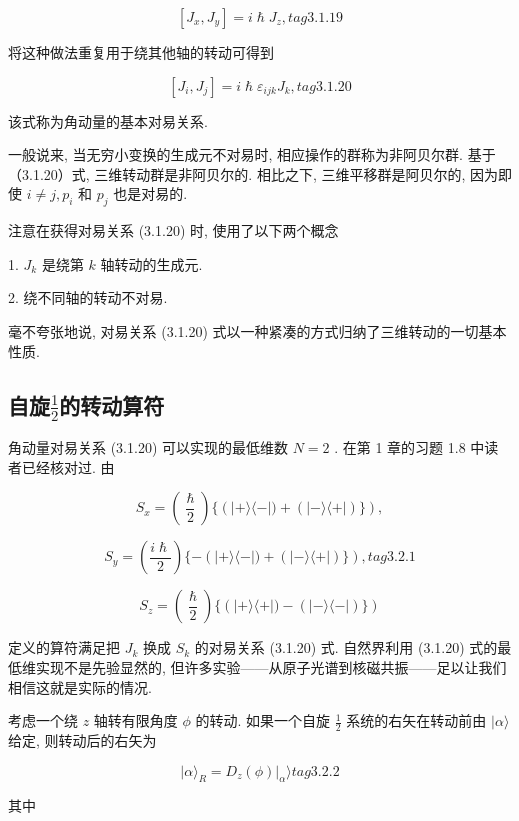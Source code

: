 $$
\left\lbrack {{J}_{x},{J}_{y}}\right\rbrack = i\hslash {J}_{z}, tag{3.1.19}
$$

将这种做法重复用于绕其他轴的转动可得到

$$
\left\lbrack {{J}_{i},{J}_{j}}\right\rbrack = i\hslash {\varepsilon }_{ijk}{J}_{k}, tag{3.1.20}
$$

该式称为角动量的基本对易关系.

一般说来, 当无穷小变换的生成元不对易时, 相应操作的群称为非阿贝尔群. 基于 （3.1.20）式, 三维转动群是非阿贝尔的. 相比之下, 三维平移群是阿贝尔的, 因为即使 $i \neq j,{p}_{i}$ 和 ${p}_{j}$ 也是对易的.

注意在获得对易关系 (3.1.20) 时, 使用了以下两个概念

1. ${J}_{k}$ 是绕第 $k$ 轴转动的生成元.

2. 绕不同轴的转动不对易.

毫不夸张地说, 对易关系 (3.1.20) 式以一种紧凑的方式归纳了三维转动的一切基本性质.

\subsection{自旋$\frac{1}{2}$的转动算符}

角动量对易关系 (3.1.20) 可以实现的最低维数 $N = 2$ . 在第 1 章的习题 1.8 中读者已经核对过. 由

$$
{S}_{x} = \left( \frac{\hslash }{2}\right) \{ \left( {\left| {+\rangle \langle - }\right| ) + \left( \left| {-\rangle \langle + }\right| \right) \} }\right) ,
$$

$$
{S}_{y} = \left( \frac{i\hslash }{2}\right) \{ - \left( {\left| {+\rangle \langle - }\right| ) + \left( \left| {-\rangle \langle + }\right| \right) \} }\right) , tag{3.2.1}
$$

$$
{S}_{z} = \left( \frac{\hslash }{2}\right) \{ \left( {\left| {+\rangle \langle + }\right| ) - \left( \left| {-\rangle \langle - }\right| \right) \} }\right)
$$

定义的算符满足把 ${J}_{k}$ 换成 ${S}_{k}$ 的对易关系 (3.1.20) 式. 自然界利用 (3.1.20) 式的最低维实现不是先验显然的, 但许多实验——从原子光谱到核磁共振——足以让我们相信这就是实际的情况.

考虑一个绕 $z$ 轴转有限角度 $\phi$ 的转动. 如果一个自旋 $\frac{1}{2}$ 系统的右矢在转动前由 $|\alpha \rangle$ 给定, 则转动后的右矢为

$$
|\alpha {\rangle }_{R} = {\left. {D}_{z}\left( \phi \right) \right| }_{\alpha }\rangle tag{3.2.2}
$$

其中

